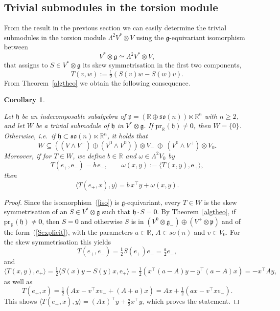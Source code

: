 \documentclass[11pt,a4paper]{amsart}
\newcommand{\p}{\mathfrak{p}}
\newcommand{\g}{\mathfrak{g}}
\newcommand{\h}{\mathfrak{h}}
\newcommand{\+}{\oplus}
\newcommand{\so}{\mathfrak{so}}
\newcommand{\1}{\mathbf{1}}
\newcommand{\e}{\mathrm{e}}
\newcommand{\R}{\mathbb{R}} %
\newcommand{\<}{\langle}
\renewcommand{\>}{\rangle}
\theoremstyle{definition}
\theoremstyle{plain}
\newtheorem{corollary}[definition]{Corollary}
\numberwithin{equation}{section}
\begin{document}
\subsection{Trivial submodules in the torsion module}
From the result in the previous section we can easily determine the trivial submodules in the torsion module $\Lambda^2V^*\otimes V$ using the $\g$-equivariant isomorphism
between 
\begin{equation}\label{iso}V^*\otimes \g  \simeq \Lambda^2V^*\otimes V,\end{equation}
that assigns to $S\in V^*\otimes \g$ its skew symmetrisation in the first two components,
\[ T(v,w):=\tfrac{1}{2}\left( S(v)w-S(w)v\right).\]
From Theorem~\ref{algtheo} we obtain the following consequence.
\begin{corollary}\label{Talgcor}

Let $\h$ be an indecomposable subalgebra of $\p=(\R\+\so(n))\ltimes \R^n$ with $n\ge 2$,  and let $W$ be a trivial submodule of $\h$ in $V^*\otimes \g$.
If $\mathrm{pr}_\R(\h)\not=0$, then $W=\{0\}$. Otherwise, i.e.~if $\h\subset \so(n)\ltimes \R^n$, it holds that
\[W\subseteq  \left(( V\wedge V^+) \+ (V^0\wedge V^0 )\right) \otimes V_-\  \+\ (V^0\wedge V^+) \otimes V_0.\] Moreover, if for  $T\in W$, 
we define $b\in \R$ and $\omega\in \Lambda^2V_0$ by
\[ T(e_+,\e_-)=b\,e_-,\qquad \omega(x,y):=\< T(x,y),\e_+\>,\]
then 
\begin{equation}\label{Talgcorequ}
\< T(e_+,x),y\>=b\, x^\top y +\omega (x,y).\end{equation}
\end{corollary}
\begin{proof}
Since the isomorphism~(\ref{iso}) is $\g$-equivariant, every $T\in W$ is the skew symmetrisation of an $S\in V^*\otimes \g$ such that $\h\cdot S=0$. By Theorem~\ref{algtheo}, if $\mathrm{pr}_\R(\h)\not=0$, then $S=0$ and otherwise $S$ is in $(V^0\otimes \g_-)\+(V^+\otimes \p)$  and of the form~(\ref{Sexplicit}), with the parameters $a\in \R$, $A\in so(n)$ and $v\in V_0$. For the skew symmetrisation this yields
\[T(e_+,e_-) =\tfrac{1}{2}S(e_+)e_-=\tfrac{a}{2} e_-,\]
and
\[\< T(x,y),e_+\> = \tfrac{1}{2}\<  S(x)y-S(y)x,\e_+\> = \tfrac{1}{2}\left( x^\top(a-A)y - y^\top(a-A)x\right) =-x^\top A  y,\]
as well as
\[T(e_+,x)= \tfrac{1}{2}\left( Ax -v^\top x e_- +(A+a)x\right)=Ax+\tfrac{1}{2}(ax  -v^\top x e_-). \]
This shows $\< T(e_+,x),y\> = (Ax)^\top y + \tfrac{a }{2}x^\top y $, which proves the statement.
\end{proof}
\end{document}
